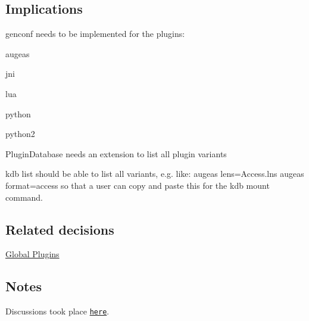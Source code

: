 \subsection*{Implications}


\begin{DoxyItemize}
\item {\ttfamily genconf} needs to be implemented for the plugins\+:
\begin{DoxyItemize}
\item augeas
\item jni
\item lua
\item python
\item python2
\end{DoxyItemize}
\item {\ttfamily Plugin\+Database} needs an extension to list all plugin variants
\item {\ttfamily kdb list} should be able to list all variants, e.\+g. like\+: {\ttfamily augeas lens=Access.\+lns} {\ttfamily augeas format=access} so that a user can copy and paste this for the {\ttfamily kdb mount} command.
\end{DoxyItemize}

\subsection*{Related decisions}


\begin{DoxyItemize}
\item \hyperlink{doc_decisions_global_plugins_md}{Global Plugins}
\end{DoxyItemize}

\subsection*{Notes}

Discussions took place \href{http://git.libelektra.org/issues/1006}{\tt here}. 